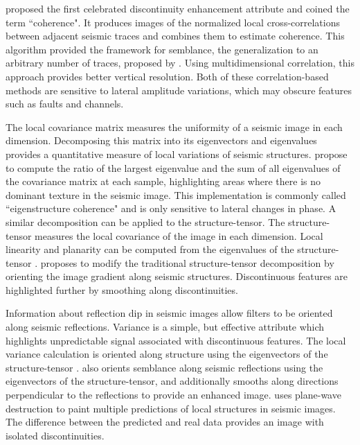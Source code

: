 \cite{bahorich} proposed the first celebrated discontinuity enhancement attribute and coined the term ``coherence". 
It produces images of the normalized local cross-correlations between adjacent seismic traces and combines them to estimate coherence. 
This algorithm provided the framework for semblance, the generalization to an arbitrary number of traces, proposed by \cite{marfurt98}. 
Using multidimensional correlation, this approach provides better vertical resolution.
Both of these correlation-based methods are sensitive to lateral amplitude variations, which may obscure features such as faults and channels.

The local covariance matrix measures the uniformity of a seismic image in each dimension. 
Decomposing this matrix into its eigenvectors and eigenvalues provides a quantitative measure of local variations of seismic structures. 
\cite{gersztenkorn} propose to compute the ratio of the largest eigenvalue and the sum of all eigenvalues of the covariance matrix at each sample, highlighting areas where there is no dominant texture in the seismic image.
This implementation is commonly called ``eigenstructure coherence" and is only sensitive to lateral changes in phase.
A similar decomposition can be applied to the structure-tensor.
The structure-tensor measures the local covariance of the image in each dimension.
Local linearity and planarity can be computed from the eigenvalues of the structure-tensor \cite[]{randen00,randen01,bakker}.
\cite{wu17} proposes to modify the traditional structure-tensor decomposition by orienting the image gradient along seismic structures.
Discontinuous features are highlighted further by smoothing along discontinuities.

Information about reflection dip in seismic images allow filters to be oriented along seismic reflections.
Variance is a simple, but effective attribute which highlights unpredictable signal associated with discontinuous features.
The local variance calculation is oriented along structure using the eigenvectors of the structure-tensor \cite[]{randen01}.
\cite{hale09} also orients semblance along seismic reflections using the eigenvectors of the structure-tensor, and additionally smooths along directions perpendicular to the reflections to provide an enhanced image.
\cite{karimi} uses plane-wave destruction to paint multiple predictions of local structures in seismic images.
The difference between the predicted and real data provides an image with isolated discontinuities.

